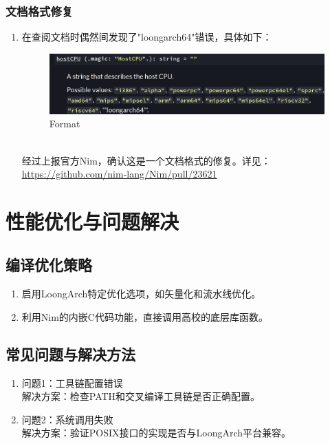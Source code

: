 \documentclass[UTF8]{ctexart}
\begin{document}
		\subsubsection{文档格式修复} %
		\begin{enumerate}[leftmargin=3.5em]
			\item 在查阅文档时偶然间发现了"loongarch64"错误，具体如下：
			\begin{figure}[htbp]
				\centering
				\includegraphics[width=0.8\linewidth]{loongarch64Format.png}
				\caption{Format}
				\label{fig:format_err}
			\end{figure} \\
			经过上报官方Nim，确认这是一个文档格式的修复。详见： \\
			\underline{\url{https://github.com/nim-lang/Nim/pull/23621}}
		\end{enumerate}

\section{性能优化与问题解决} %
	\subsection{编译优化策略} %
	\begin{enumerate}[leftmargin=3.5em]
		\item 启用LoongArch特定优化选项，如矢量化和流水线优化。
		\item 利用Nim的内嵌C代码功能，直接调用高校的底层库函数。
	\end{enumerate}
	\subsection{常见问题与解决方法} %
	\begin{enumerate}[leftmargin=3.5em]
		\item 问题1：工具链配置错误 \\ 解决方案：检查PATH和交叉编译工具链是否正确配置。
		\item 问题2：系统调用失败 \\ 解决方案：验证POSIX接口的实现是否与LoongArch平台兼容。
	\end{enumerate}
\end{document}
